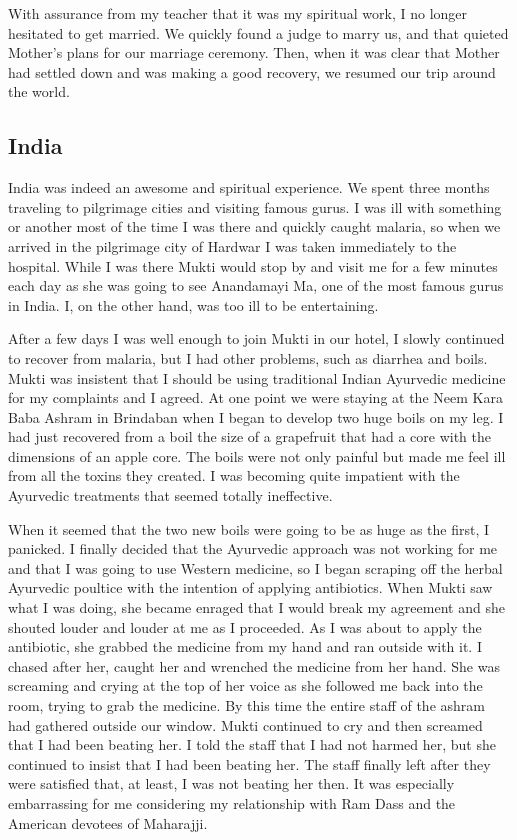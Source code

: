 \documentclass[a5paper,10pt,english]{book}
\begin{document}
\sphinxAtStartPar
With assurance from my teacher that it was my spiritual work, I no
longer hesitated to get married. We quickly found a judge to marry us,
and that quieted Mother’s plans for our marriage ceremony. Then, when it
was clear that Mother had settled down and was making a good recovery,
we resumed our trip around the world.


\subsection{India}
\label{\detokenize{psychopaths:india}}
\sphinxAtStartPar
India was indeed an awesome and spiritual experience. We spent three
months traveling to pilgrimage cities and visiting famous gurus. I was
ill with something or another most of the time I was there and quickly
caught malaria, so when we arrived in the pilgrimage city of Hardwar I
was taken immediately to the hospital. While I was there Mukti would
stop by and visit me for a few minutes each day as she was going to see
Anandamayi Ma, one of the most famous gurus in India. I, on the other
hand, was too ill to be entertaining.

\sphinxAtStartPar
After a few days I was well enough to join Mukti in our hotel, I slowly
continued to recover from malaria, but I had other problems, such as
diarrhea and boils. Mukti was insistent that I should be using
traditional Indian Ayurvedic medicine for my complaints and I agreed. At
one point we were staying at the Neem Kara Baba Ashram in Brindaban when
I began to develop two huge boils on my leg. I had just recovered from a
boil the size of a grapefruit that had a core with the dimensions of an
apple core. The boils were not only painful but made me feel ill from
all the toxins they created. I was becoming quite impatient with the
Ayurvedic treatments that seemed totally ineffective.

\sphinxAtStartPar
When it seemed that the two new boils were going to be as huge as the
first, I panicked. I finally decided that the Ayurvedic approach was not
working for me and that I was going to use Western medicine, so I began
scraping off the herbal Ayurvedic poultice with the intention of
applying antibiotics. When Mukti saw what I was doing, she became
enraged that I would break my agreement and she shouted louder and
louder at me as I proceeded. As I was about to apply the antibiotic, she
grabbed the medicine from my hand and ran outside with it. I chased
after her, caught her and wrenched the medicine from her hand. She was
screaming and crying at the top of her voice as she followed me back
into the room, trying to grab the medicine. By this time the entire
staff of the ashram had gathered outside our window. Mukti continued to
cry and then screamed that I had been beating her. I told the staff that
I had not harmed her, but she continued to insist that I had been
beating her. The staff finally left after they were satisfied that, at
least, I was not beating her then. It was especially embarrassing for me
considering my relationship with Ram Dass and the American devotees of
Maharajji.
\end{document}
